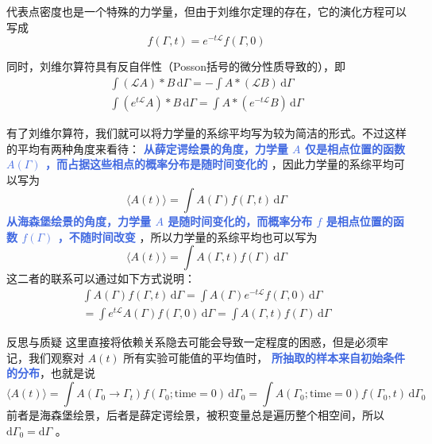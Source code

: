 代表点密度也是一个特殊的力学量，但由于刘维尔定理的存在，它的演化方程可以写成
\begin{equation}\label{equ:代表点密度的演化方程}
    f(\Gamma,t) =  e^{-t\mathcal{L}}f(\Gamma,0)
\end{equation}

同时，刘维尔算符具有反自伴性（Posson括号的微分性质导致的），即
\begin{align}\label{equ:反自伴性}
    \int (\mathcal{L}A)*B \,\mathrm{d}\Gamma= -\int A*(\mathcal{L}B) \,\mathrm{d}\Gamma \\
    \int (e^{t\mathcal{L}}A)*B \,\mathrm{d}\Gamma= \int A*(e^{-t\mathcal{L}}B) \,\mathrm{d}\Gamma
\end{align}

有了刘维尔算符，我们就可以将力学量的系综平均写为较为简洁的形式。不过这样的平均有两种角度来看待： \textcolor{RoyalBlue}{\textbf{\kaishu 从薛定谔绘景的角度，力学量 $A$ 仅是相点位置的函数 $A(\Gamma)$ ，而占据这些相点的概率分布是随时间变化的}} ，因此力学量的系综平均可以写为
\begin{equation}\label{equ:力学量的系综平均，薛定谔绘景}
    \langle A(t) \rangle = \int A(\Gamma) f(\Gamma, t) \,\mathrm{d}\Gamma
\end{equation}
\textcolor{RoyalBlue}{\textbf{\kaishu 从海森堡绘景的角度，力学量 $A$ 是随时间变化的，而概率分布 $f$ 是相点位置的函数 $f(\Gamma)$ ，不随时间改变}} ，所以力学量的系综平均也可以写为
\begin{equation}\label{equ:力学量的系综平均，海森堡绘景}
    \langle A(t) \rangle = \int A(\Gamma,t) f(\Gamma) \,\mathrm{d}\Gamma
\end{equation}
这二者的联系可以通过如下方式说明：
\begin{align*}
    \int A(\Gamma) f(\Gamma, t) \,\mathrm{d}\Gamma = \int A(\Gamma) e^{-t\mathcal{L}}f(\Gamma,0) \,\mathrm{d}\Gamma \\
    = \int e^{t\mathcal{L}}A(\Gamma) f(\Gamma,0) \,\mathrm{d}\Gamma = \int A(\Gamma,t) f(\Gamma) \,\mathrm{d}\Gamma
\end{align*}
\begin{justification}{\kaishu 反思与质疑}
\kaishu \fontsize{11pt}{16pt}
    这里直接将依赖关系隐去可能会导致一定程度的困惑，但是必须牢记，我们观察对 $A(t)$ 所有实验可能值的平均值时， \textcolor{RoyalBlue}{\textbf{\kaishu  所抽取的样本来自初始条件的分布}}，也就是说
    \[
        \langle A(t) \rangle = \int A(\Gamma_0\rightarrow \Gamma_t) f(\Gamma_0; \text{time} = 0) \,\mathrm{d}\Gamma_0 = \int A(\Gamma_0;\text{time} = 0) f(\Gamma_0,t) \,\mathrm{d}\Gamma_0
    \]
    前者是海森堡绘景，后者是薛定谔绘景，被积变量总是遍历整个相空间，所以 $\mathrm{d}\Gamma_0 = \mathrm{d}\Gamma$ 。
\end{justification}

